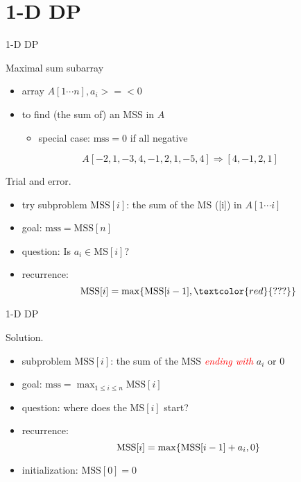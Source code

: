 \section{1-D DP}

\begin{frame}{1-D DP}
  \begin{exampleblock}{Maximal sum subarray }
    \begin{itemize}
      \item array $A[1 \cdots n], a_{i} >=< 0$
      \item to find (the sum of) an MSS in $A$
	\begin{itemize}
	  \item special case: $\text{mss} = 0$ if all negative
	\end{itemize}
    \end{itemize}
	
    \[
      A[-2,1 ,-3,4,-1,2,1,-5,4] \Rightarrow [4,-1,2,1]
    \]
  \end{exampleblock}

  \begin{alertblock}{Trial and error.}
    \begin{itemize}
      \item try subproblem $\text{MSS}[i]$: the sum of the MS ([i]) in $A[1 \cdots i]$
      \item goal: $\text{mss} = \text{MSS}[n]$
      \item question: Is $a_{i} \in \text{MS}[i]$?
      \item recurrence: 
	\[ 
	  \text{MSS}[i] = \max \set{\text{MSS}[i-1], \textcolor{red}{???}}
	\]
    \end{itemize}
  \end{alertblock}
\end{frame}
\begin{frame}{1-D DP}
  \begin{block}{Solution.}
    \begin{itemize}
      \item subproblem $\text{MSS}[i]$: the sum of the MSS \textcolor{red}{\it ending with} $a_{i}$ or 0
      \item goal: $\text{mss} = \max_{1 \le i \le n} \text{MSS}[i]$
      \item question: where does the $\text{MS}[i]$ start?
      \item recurrence: 
	\[ 
	  \text{MSS}[i] = \max \{\text{MSS}[i-1] + a_{i}, 0\} 
	\]
      \item initialization: $\text{MSS}[0] = 0$
    \end{itemize}
  \end{block}
\end{frame}
